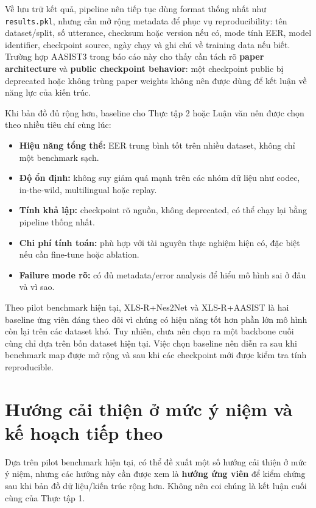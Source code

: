 Về lưu trữ kết quả, pipeline nên tiếp tục dùng format thống nhất như \texttt{results.pkl}, nhưng cần mở rộng metadata để phục vụ reproducibility: tên dataset/split, số utterance, checksum hoặc version nếu có, mode tính EER, model identifier, checkpoint source, ngày chạy và ghi chú về training data nếu biết. Trường hợp AASIST3 trong báo cáo này cho thấy cần tách rõ \textbf{paper architecture} và \textbf{public checkpoint behavior}: một checkpoint public bị deprecated hoặc không trùng paper weights không nên được dùng để kết luận về năng lực của kiến trúc.

Khi bản đồ đủ rộng hơn, baseline cho Thực tập 2 hoặc Luận văn nên được chọn theo nhiều tiêu chí cùng lúc:

\begin{itemize}
    \item \textbf{Hiệu năng tổng thể:} EER trung bình tốt trên nhiều dataset, không chỉ một benchmark sạch.
    \item \textbf{Độ ổn định:} không suy giảm quá mạnh trên các nhóm dữ liệu như codec, in-the-wild, multilingual hoặc replay.
    \item \textbf{Tính khả lập:} checkpoint rõ nguồn, không deprecated, có thể chạy lại bằng pipeline thống nhất.
    \item \textbf{Chi phí tính toán:} phù hợp với tài nguyên thực nghiệm hiện có, đặc biệt nếu cần fine-tune hoặc ablation.
    \item \textbf{Failure mode rõ:} có đủ metadata/error analysis để hiểu mô hình sai ở đâu và vì sao.
\end{itemize}

Theo pilot benchmark hiện tại, XLS-R+Nes2Net và XLS-R+AASIST là hai baseline ứng viên đáng theo dõi vì chúng có hiệu năng tốt hơn phần lớn mô hình còn lại trên các dataset khó. Tuy nhiên, chưa nên chọn ra một backbone cuối cùng chỉ dựa trên bốn dataset hiện tại. Việc chọn baseline nên diễn ra sau khi benchmark map được mở rộng và sau khi các checkpoint mới được kiểm tra tính reproducible.

\section{Hướng cải thiện ở mức ý niệm và kế hoạch tiếp theo}

Dựa trên pilot benchmark hiện tại, có thể đề xuất một số hướng cải thiện ở mức ý niệm, nhưng các hướng này cần được xem là \textbf{hướng ứng viên} để kiểm chứng sau khi bản đồ dữ liệu/kiến trúc rộng hơn. Không nên coi chúng là kết luận cuối cùng của Thực tập 1.

